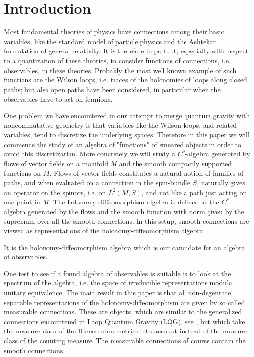 \documentclass[12pt]{article}
\begin{document}
\newpage
\tableofcontents










\section{Introduction}

Most fundamental theories of physics have connections among their basic variables,  like the standard model of particle physics and the Ashtekar formulation of general relativity. It is therefore important, especially with respect to a quantization of these theories, to consider functions of connections, i.e. observables, in these theories. Probably the most well known example of such functions are the Wilson loops, i.e. traces of the holonomies of loops along closed paths; but also open paths have been considered, in particular when the observables have to act on fermions.

One problem we have encountered in our attempt  \cite{AastrupGrimstruprew} to merge quantum gravity with noncommutative geometry  is that variables like the Wilson loops, and related variables, tend to discretize the underlying spaces. Therefore in this paper we will commence the study of an algebra of "functions" of smeared objects in order to avoid this discretization. More concretely we will study a $C^*$-algebra generated by flows of vector fields on a manifold $M$ and the smooth compactly supported functions on $M$. Flows of vector fields constitutes a natural notion of families of paths, and when evaluated on a connection in the spin-bundle $S$, naturally gives an operator on the spinors, i.e. on $L^2(M,S)$, and not like a path just acting on one point in $M$. The holonomy-diffeomorphism algebra is defined as the $C^*$-algebra generated by the flows and the smooth function with norm given by the supremum over all the smooth connections.   In this setup, smooth connections are viewed as representations of the holonomy-diffeomorphism algebra.      

It is the holonomy-diffeomorphism algebra which is our candidate for an algebra of observables.

One test to see if a found algebra of observables is suitable is to look at the spectrum of the algebra, i.e. the space of irreducible representations modulo unitary equivalence.
The main result in this paper is that all non-degenrate separable representations of the holonomy-diffeomorphism are given by  so called measurable connections. These are objects, which are similar to the generalized connections encountered in Loop Quantum Gravity (LQG), see \cite{AshtekarLewandowski}, but which take the measure class of the Riemannian metrics into account instead of the measure class of the counting measure.  The measurable  connections of course contain the smooth connections. 
\end{document}

